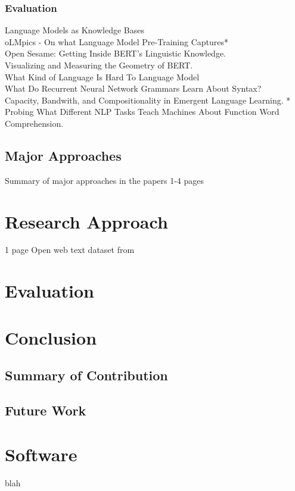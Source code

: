 \documentclass [11pt, proquest] {uwthesis}[2020/08/20]
\begin{document}
\subsection{Evaluation}
Language Models as Knowledge Bases\\
oLMpics - On what Language Model Pre-Training Captures* \\
Open Sesame: Getting Inside BERT's Linguistic Knowledge. \\
Visualizing and Measuring the Geometry of BERT. \\
What Kind of Language Is Hard To Language Model \\
What Do Recurrent Neural Network Grammars Learn About Syntax? \\
Capacity, Bandwith, and Compositionality in Emergent Language Learning. * \\
Probing What Different NLP Tasks Teach Machines About Function Word Comprehension.
\section{Major Approaches}
Summary of major approaches in the papers 1-4 pages
\chapter{Research Approach}
1 page
Open web text dataset from \cite{Gokaslan2019OpenWeb}
\chapter{Evaluation}
\chapter{Conclusion}
\section{Summary of Contribution}
\section{Future Work}
\printendnotes
\nocite{*}


\appendix
\raggedbottom\sloppy
\chapter{Software}
blah
\end{document}
